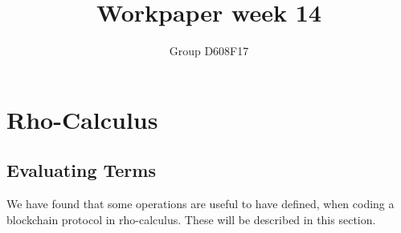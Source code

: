 

\setlength{\parindent}{0pt}
\author{Group D608F17}
\title{Workpaper week 14}



\maketitle
\section{Rho-Calculus}





\subsection{Evaluating Terms}
We have found that some operations are useful to have defined, when coding a blockchain protocol in rho-calculus. These will be described in this section.









\grid
\grid
